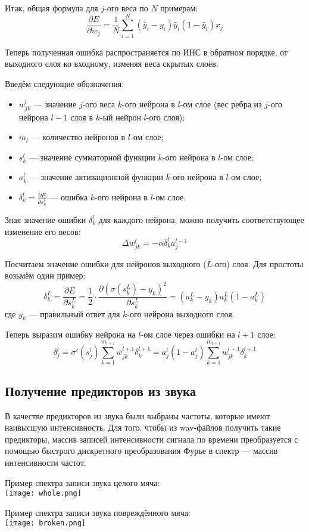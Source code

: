 	Итак, общая формула для $j$-ого веса по $N$ примерам:
	\[
		\frac{\partial E}{\partial w_j} = \frac{1}{N}\sum_{i = 1}^N
		\left(\hat y_i - y_i\right)\hat y_i\left(1 - \hat y_i\right) x_j
	\]

	Теперь полученная ошибка распространяется по ИНС в обратном порядке, от выходного слоя ко входному, изменяя веса скрытых слоёв.
	
	Введём следующие обозначения:
	\begin{itemize}
		\item $w_{jk}^l$ --- значение $j$-ого веса $k$-ого нейрона в $l$-ом слое (вес ребра из $j$-ого нейрона $l - 1$ слоя в $k$-ый нейрон $l$-ого слоя);
		\item $m_l$ --- количество нейронов в $l$-ом слое;
		\item $s_k^l$ --- значение сумматорной функции $k$-ого нейрона в $l$-ом слое;
		\item $a_k^l$ --- значение активационной функции $k$-ого нейрона в $l$-ом слое;
		\item $\delta_k^l = \frac{\partial E}{\partial s_k^l}$ --- ошибка $k$-ого нейрона в $l$-ом слое.
	\end{itemize}

	Зная значение ошибки $\delta_k^l$ для каждого нейрона, можно получить соответствующее изменение его весов:
	\[
		\Delta w_{jk}^l = -\alpha\delta_k^l a_j^{l-1}
	\]

	Посчитаем значение ошибки для нейронов выходного ($L$-ого) слоя. Для простоты возьмём один пример:
	\[
		\delta_k^L = \frac{\partial E}{\partial s_k^L} =
		\frac{1}{2}\cdot\frac{\partial\left(\sigma\left(s_k^L\right) - y_k\right)^2}{\partial s_k^L} = 
		\left(a_k^L - y_k\right)a_k^L\left(1 - a_k^L\right)
	\]
	где $y_k$ --- правильный ответ для $k$-ого нейрона выходного слоя.

	Теперь выразим ошибку нейрона на $l$-ом слое через ошибки на $l + 1$ слое:
	\[
		\delta_j^l = \sigma\prime\left(s_j^l\right)\sum_{k = 1}^{m_{l + 1}} w_{jk}^{l + 1} \delta_k^{l+1} = 
		a_j^l\left(1 - a_j^l\right)\sum_{k = 1}^{m_{l + 1}} w_{jk}^{l + 1} \delta_k^{l+1}
	\]

\subsection{Получение предикторов из звука}
	В качестве предикторов из звука были выбраны частоты, которые имеют наивысшую интенсивность.
	Для того, чтобы из wav-файлов получить такие предикторы, массив записей интенсивности сигнала по времени
	преобразуется с помощью быстрого дискретного преобразования Фурье в спектр --- массив интенсивности частот.

	\newpage
	\parskip=0cm

	Пример спектра записи звука целого мяча:\\
	\texttt{[image: whole.png]}

	Пример спектра записи звука повреждённого мяча:\\
	\texttt{[image: broken.png]}

	\parskip=0.2cm